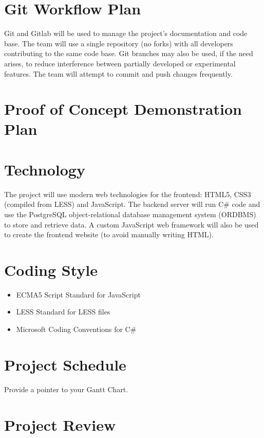 \documentclass{article}
\begin{document}
\section{Git Workflow Plan}
Git and Gitlab will be used to manage the project's documentation and code
base. The team will use a single repository (no forks) with all developers
contributing to the same code base. Git branches may also be used, if the need
arises, to reduce interference between partially developed or experimental
features. The team will attempt to commit and push changes frequently.

\section{Proof of Concept Demonstration Plan}

\section{Technology}
The project will use modern web technologies for the frontend: HTML5, CSS3
(compiled from LESS) and JavaScript. The backend server will run C\# code and
use the PostgreSQL object-relational database management system (ORDBMS) to
store and retrieve data. A custom JavaScript web framework will also be used to
create the frontend website (to avoid manually writing HTML).

\section{Coding Style}
\begin{itemize}
  \item ECMA5 Script Standard for JavaScript
  \item LESS Standard for LESS files
  \item Microsoft Coding Conventions for C\#
\end{itemize}

\section{Project Schedule}

Provide a pointer to your Gantt Chart.

\section{Project Review}
\end{document}
